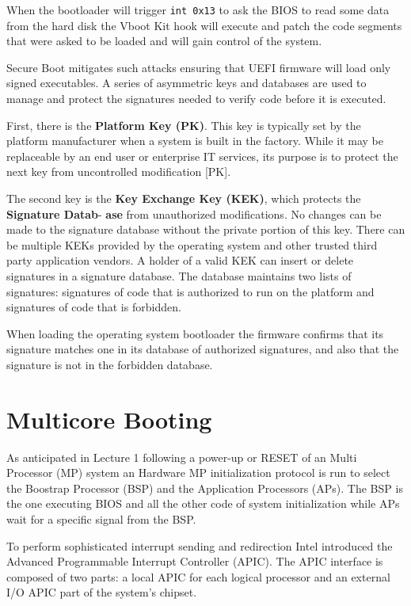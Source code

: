 \documentclass[twoside]{article}
\renewcommand{\cite}[1]{[#1]}
\begin{document}
When the bootloader will trigger \texttt{int 0x13} to ask the BIOS to read some data from the hard disk the Vboot Kit hook will execute and patch the code segments that were asked to be loaded and will gain control of the system.

Secure \marginnote{(\cite{secb} pp. 7)} Boot mitigates such attacks ensuring that UEFI firmware will load only signed executables. A series of asymmetric keys and databases are used to manage and protect the  signatures needed  to verify code before it is executed.

First, there is the \textbf{Platform Key (PK)}. This key is typically set by the platform manufacturer when a system  is built in the factory. While it may be replaceable by an end user or enterprise IT services, its purpose is to protect the next key from uncontrolled modification \cite{PK}.

The second key is the \textbf{Key Exchange Key (KEK)}, which protects the \textbf{Signature Datab}- \textbf{ase} from unauthorized modifications. No changes can be made to the signature database without the private portion of this key. There can be multiple KEKs provided by the operating system and other trusted third party application vendors. A holder of a valid KEK can insert or delete signatures in a signature database. The database maintains two lists of signatures: signatures of code that is authorized to run on the platform and signatures of code that is forbidden. 

When loading the operating system bootloader the firmware confirms that its signature matches one in its database of authorized signatures, and also that the signature is not in the forbidden database.

\section{Multicore Booting}

As \marginnote{(\cite{intel} Sec. 8.4)} anticipated in Lecture 1 following a power-up or RESET of an Multi Processor (MP) system an Hardware MP initialization protocol is run to select the Boostrap Processor (BSP) and the Application Processors (APs). The BSP is the one executing BIOS and all the other code of system initialization while APs wait for a specific signal from the BSP.

To perform \marginnote{(\cite{intel} Chap. 10)} sophisticated interrupt sending and redirection Intel introduced the Advanced Programmable Interrupt Controller (APIC).  The APIC interface is composed of two parts: a local APIC for each logical processor and an external I/O APIC part of the system's chipset.
\end{document}
